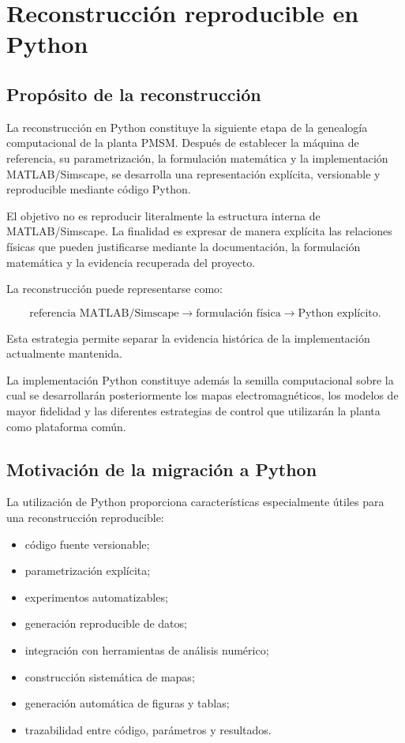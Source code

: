 \section{Reconstrucción reproducible en Python}

\subsection{Propósito de la reconstrucción}

La reconstrucción en Python constituye la siguiente etapa de la genealogía computacional de la planta PMSM. Después de establecer la máquina de referencia, su parametrización, la formulación matemática y la implementación MATLAB/Simscape, se desarrolla una representación explícita, versionable y reproducible mediante código Python.

El objetivo no es reproducir literalmente la estructura interna de MATLAB/Simscape. La finalidad es expresar de manera explícita las relaciones físicas que pueden justificarse mediante la documentación, la formulación matemática y la evidencia recuperada del proyecto.

La reconstrucción puede representarse como:

\begin{equation}
\text{referencia MATLAB/Simscape}
\rightarrow
\text{formulación física}
\rightarrow
\text{Python explícito}.
\end{equation}

Esta estrategia permite separar la evidencia histórica de la implementación actualmente mantenida.

La implementación Python constituye además la semilla computacional sobre la cual se desarrollarán posteriormente los mapas electromagnéticos, los modelos de mayor fidelidad y las diferentes estrategias de control que utilizarán la planta como plataforma común.

\subsection{Motivación de la migración a Python}

La utilización de Python proporciona características especialmente útiles para una reconstrucción reproducible:

\begin{itemize}
    \item código fuente versionable;
    \item parametrización explícita;
    \item experimentos automatizables;
    \item generación reproducible de datos;
    \item integración con herramientas de análisis numérico;
    \item construcción sistemática de mapas;
    \item generación automática de figuras y tablas;
    \item trazabilidad entre código, parámetros y resultados.
\end{itemize}

